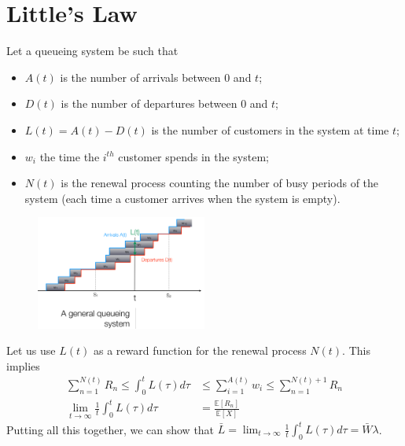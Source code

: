 \documentclass[12pt, openany]{report}
\newcommand{\E}{\mathbb{E}}
\theoremstyle{definition}
\begin{document}
\section{Little's Law}
Let a queueing system be such that 
\begin{itemize}
	\item $A(t)$ is the number of arrivals between $0$ and $t$;
	\item $D(t)$ is the number of departures between $0$ and $t$;
	\item $L(t)=A(t)-D(t)$ is the number of customers in the system at time $t$;
	\item $w_i$ the time the $i^{th}$ customer spends in the system;
	\item $N(t)$ is the renewal process counting the number of busy periods of the system (each time a customer arrives when the system is empty).
\end{itemize}
\begin{figure}[H]
	\centering
	\includegraphics[width=0.5\textwidth]{img/queue.png}
\end{figure}
Let us use $L(t)$ as a reward function for the renewal process $N(t)$. This implies 
\begin{equation}
	\begin{aligned}
		\sum_{n=1}^{N(t)} R_n \le \int_0^t L(\tau)d\tau &\le \sum_{i=1}^{A(t)} w_i \le \sum_{n=1}^{N(t)+1} R_n\\
		\lim_{t\to \infty} \frac{1}{t}\int_0^t L(\tau)d\tau &= \frac{\E[R_n]}{\E[X]}	
	\end{aligned}
\end{equation}
Putting all this together, we can show that $\bar L=\lim_{t\to \infty}\frac{1}{t}\int_0^tL(\tau)d\tau = \bar  W\lambda$.
\end{document}
